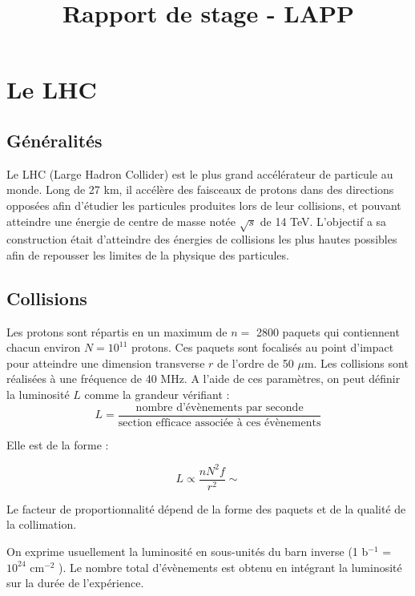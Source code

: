 \documentclass[11pt]{article} %
\title{Rapport de stage - LAPP}
\begin{document}
\maketitle

\tableofcontents

\abstract{  }
 
\section{Le LHC}

\subsection{Généralités}

Le LHC (Large Hadron Collider) est le plus grand accélérateur de particule au monde. Long de 27 km, il accélère des faisceaux de protons dans des directions opposées afin d'étudier les particules produites lors de leur collisions, et pouvant atteindre une énergie de centre de masse notée $\sqrt{s}$ de 14 TeV. L'objectif a sa construction était d'atteindre des énergies de collisions les plus hautes possibles afin de repousser les limites de la physique des particules.

\subsection{Collisions}

Les protons sont répartis en un maximum de $n =$ 2800 paquets qui contiennent chacun environ $N = 10^{11}$ protons. Ces paquets sont focalisés au point d'impact pour atteindre une dimension transverse $r$ de l'ordre de 50 $\mu$m. Les collisions sont réalisées à une fréquence de 40 MHz. A l'aide de ces paramètres, on peut définir la luminosité $L$ comme la grandeur vérifiant :
\begin{equation}
L = \dfrac{\mbox{nombre d'évènements par seconde}}{\mbox{section efficace associée à ces évènements}}
\end{equation}

Elle est de la forme :

\begin{equation}
L \propto \dfrac{nN^2f}{r^2} \sim
\end{equation}

Le facteur de proportionnalité dépend de la forme des paquets et de la qualité de la collimation.

On exprime usuellement la luminosité en sous-unités du barn inverse (1 b${}^{-1}$ = $10^{24}$ cm${}^{-2}$ ).
Le nombre total d'évènements est obtenu en intégrant la luminosité sur la durée de l'expérience.
\end{document}
